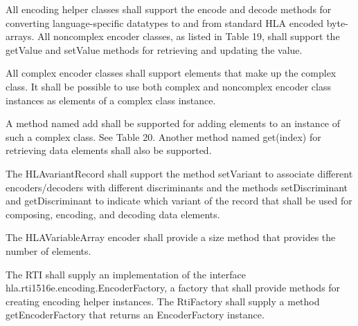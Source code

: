 \begin{compactstdpage}
    All encoding helper classes shall support the encode and decode methods for converting language-specific datatypes to and from standard HLA encoded byte-arrays. All noncomplex encoder classes, as listed in Table 19, shall support the getValue and setValue methods for retrieving and updating the value.

    All complex encoder classes shall support elements that make up the complex class. It shall be possible to use both complex and noncomplex encoder class instances as elements of a complex class instance.

    A method named add shall be supported for adding elements to an instance of such a complex class. See Table 20. Another method named get(index) for retrieving data elements shall also be supported.

    The HLAvariantRecord shall support the method setVariant to associate different encoders/decoders with different discriminants and the methods setDiscriminant and getDiscriminant to indicate which variant of the record that shall be used for composing, encoding, and decoding data elements.

    The HLAVariableArray encoder shall provide a size method that provides the number of elements.

    The RTI shall supply an implementation of the interface hla.rti1516e.encoding.EncoderFactory, a factory that shall provide methods for creating encoding helper instances. The RtiFactory shall supply a method getEncoderFactory that returns an EncoderFactory instance.

\end{compactstdpage}

\clearpage

\begin{compactstdpage}
    \cxiitablenineteenandtwenty

\end{compactstdpage}

\clearpage

